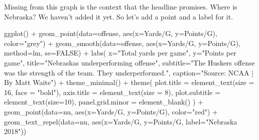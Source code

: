 \documentclass[
  letterpaper,
  DIV=11,
  numbers=noendperiod]{scrreprt}
\newenvironment{Shaded}{\begin{snugshade}}{\end{snugshade}}
\newcommand{\AttributeTok}[1]{\textcolor[rgb]{0.40,0.45,0.13}{#1}}
\newcommand{\ConstantTok}[1]{\textcolor[rgb]{0.56,0.35,0.01}{#1}}
\newcommand{\DecValTok}[1]{\textcolor[rgb]{0.68,0.00,0.00}{#1}}
\newcommand{\FunctionTok}[1]{\textcolor[rgb]{0.28,0.35,0.67}{#1}}
\newcommand{\NormalTok}[1]{\textcolor[rgb]{0.00,0.23,0.31}{#1}}
\newcommand{\SpecialCharTok}[1]{\textcolor[rgb]{0.37,0.37,0.37}{#1}}
\newcommand{\StringTok}[1]{\textcolor[rgb]{0.13,0.47,0.30}{#1}}
\begin{document}
Missing from this graph is the context that the headline promises. Where
is Nebraska? We haven't added it yet. So let's add a point and a label
for it.

\begin{Shaded}
\begin{Highlighting}[]
\FunctionTok{ggplot}\NormalTok{() }\SpecialCharTok{+} 
  \FunctionTok{geom\_point}\NormalTok{(}\AttributeTok{data=}\NormalTok{offense, }\FunctionTok{aes}\NormalTok{(}\AttributeTok{x=}\StringTok{\textasciigrave{}}\AttributeTok{Yards/G}\StringTok{\textasciigrave{}}\NormalTok{, }\AttributeTok{y=}\StringTok{\textasciigrave{}}\AttributeTok{Points/G}\StringTok{\textasciigrave{}}\NormalTok{), }\AttributeTok{color=}\StringTok{"grey"}\NormalTok{) }\SpecialCharTok{+} 
  \FunctionTok{geom\_smooth}\NormalTok{(}\AttributeTok{data=}\NormalTok{offense, }\FunctionTok{aes}\NormalTok{(}\AttributeTok{x=}\StringTok{\textasciigrave{}}\AttributeTok{Yards/G}\StringTok{\textasciigrave{}}\NormalTok{, }\AttributeTok{y=}\StringTok{\textasciigrave{}}\AttributeTok{Points/G}\StringTok{\textasciigrave{}}\NormalTok{), }\AttributeTok{method=}\NormalTok{lm, }\AttributeTok{se=}\ConstantTok{FALSE}\NormalTok{) }\SpecialCharTok{+} 
  \FunctionTok{labs}\NormalTok{(}
    \AttributeTok{x=}\StringTok{"Total yards per game"}\NormalTok{, }
    \AttributeTok{y=}\StringTok{"Points per game"}\NormalTok{, }
    \AttributeTok{title=}\StringTok{"Nebraska\textquotesingle{}s underperforming offense"}\NormalTok{, }
    \AttributeTok{subtitle=}\StringTok{"The Husker\textquotesingle{}s offense was the strength of the team. They underperformed."}\NormalTok{, }
    \AttributeTok{caption=}\StringTok{"Source: NCAA | By Matt Waite"}\NormalTok{) }\SpecialCharTok{+} 
  \FunctionTok{theme\_minimal}\NormalTok{() }\SpecialCharTok{+} 
  \FunctionTok{theme}\NormalTok{(}
    \AttributeTok{plot.title =} \FunctionTok{element\_text}\NormalTok{(}\AttributeTok{size =} \DecValTok{16}\NormalTok{, }\AttributeTok{face =} \StringTok{"bold"}\NormalTok{),}
    \AttributeTok{axis.title =} \FunctionTok{element\_text}\NormalTok{(}\AttributeTok{size =} \DecValTok{8}\NormalTok{), }
    \AttributeTok{plot.subtitle =} \FunctionTok{element\_text}\NormalTok{(}\AttributeTok{size=}\DecValTok{10}\NormalTok{), }
    \AttributeTok{panel.grid.minor =} \FunctionTok{element\_blank}\NormalTok{()}
\NormalTok{    ) }\SpecialCharTok{+}
  \FunctionTok{geom\_point}\NormalTok{(}\AttributeTok{data=}\NormalTok{nu, }\FunctionTok{aes}\NormalTok{(}\AttributeTok{x=}\StringTok{\textasciigrave{}}\AttributeTok{Yards/G}\StringTok{\textasciigrave{}}\NormalTok{, }\AttributeTok{y=}\StringTok{\textasciigrave{}}\AttributeTok{Points/G}\StringTok{\textasciigrave{}}\NormalTok{), }\AttributeTok{color=}\StringTok{"red"}\NormalTok{) }\SpecialCharTok{+} 
  \FunctionTok{geom\_text\_repel}\NormalTok{(}\AttributeTok{data=}\NormalTok{nu, }\FunctionTok{aes}\NormalTok{(}\AttributeTok{x=}\StringTok{\textasciigrave{}}\AttributeTok{Yards/G}\StringTok{\textasciigrave{}}\NormalTok{, }\AttributeTok{y=}\StringTok{\textasciigrave{}}\AttributeTok{Points/G}\StringTok{\textasciigrave{}}\NormalTok{, }\AttributeTok{label=}\StringTok{"Nebraska 2018"}\NormalTok{))}
\end{Highlighting}
\end{Shaded}
\end{document}
